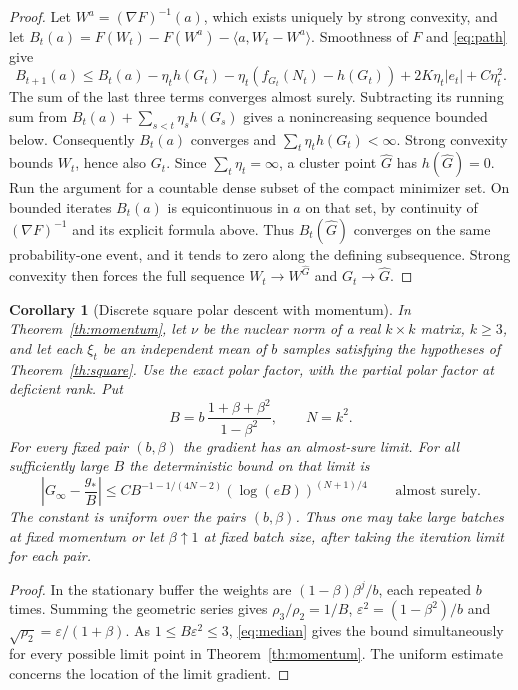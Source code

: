 \documentclass[10pt,letterpaper]{article}
\newtheorem{corollary}[theorem]{Corollary}
\newcommand{\ip}[2]{\langle #1,#2\rangle}
\newcommand{\eps}{\varepsilon}
\newcommand{\gstar}{g_{\!*}}
\begin{document}
\begin{proof}
Let $W^a=(\nabla F)^{-1}(a)$, which exists uniquely by strong convexity, and let
$B_t(a)=F(W_t)-F(W^a)-\ip a{W_t-W^a}$. Smoothness of $F$ and \eqref{eq:path} give
\[
 B_{t+1}(a)\le B_t(a)-\eta_t h(G_t)
 -\eta_t(f_{G_t}(N_t)-h(G_t))+2K\eta_t|e_t|+C\eta_t^2 .
\]
The sum of the last three terms converges almost surely. Subtracting its running sum from $B_t(a)+\sum_{s<t}\eta_s h(G_s)$ gives a nonincreasing sequence bounded below. Consequently $B_t(a)$ converges and $\sum_t\eta_t h(G_t)<\infty$. Strong convexity bounds $W_t$, hence also $G_t$. Since $\sum_t\eta_t=\infty$, a cluster point $\widehat G$ has $h(\widehat G)=0$. Run the argument for a countable dense subset of the compact minimizer set. On bounded iterates $B_t(a)$ is equicontinuous in $a$ on that set, by continuity of $(\nabla F)^{-1}$ and its explicit formula above. Thus $B_t(\widehat G)$ converges on the same probability-one event, and it tends to zero along the defining subsequence. Strong convexity then forces the full sequence $W_t\to W^{\widehat G}$ and $G_t\to\widehat G$.
\end{proof}

\begin{corollary}[Discrete square polar descent with momentum]\label{cor:joint}
In Theorem~\ref{th:momentum}, let $\nu$ be the nuclear norm of a real $k\times k$ matrix, $k\ge3$, and let each $\xi_t$ be an independent mean of $b$ samples satisfying the hypotheses of Theorem~\ref{th:square}. Use the exact polar factor, with the partial polar factor at deficient rank. Put
\[
 B=b\,\frac{1+\beta+\beta^2}{1-\beta^2},\qquad N=k^2 .
\]
For every fixed pair $(b,\beta)$ the gradient has an almost-sure limit. For all sufficiently large $B$ the deterministic bound on that limit is
\[
 \left|G_\infty-\frac{\gstar}{B}\right|
 \le C B^{-1-1/(4N-2)}(\log(eB))^{(N+1)/4}
 \qquad\text{almost surely}.
\]
The constant is uniform over the pairs $(b,\beta)$. Thus one may take large batches at fixed momentum or let $\beta\uparrow1$ at fixed batch size, after taking the iteration limit for each pair.
\end{corollary}
\begin{proof}
In the stationary buffer the weights are $(1-\beta)\beta^j/b$, each repeated $b$ times. Summing the geometric series gives $\rho_3/\rho_2=1/B$, $\eps^2=(1-\beta^2)/b$ and $\sqrt{\rho_2}=\eps/(1+\beta)$. As $1\le B\eps^2\le3$, \eqref{eq:median} gives the bound simultaneously for every possible limit point in Theorem~\ref{th:momentum}. The uniform estimate concerns the location of the limit gradient.
\end{proof}
\end{document}
